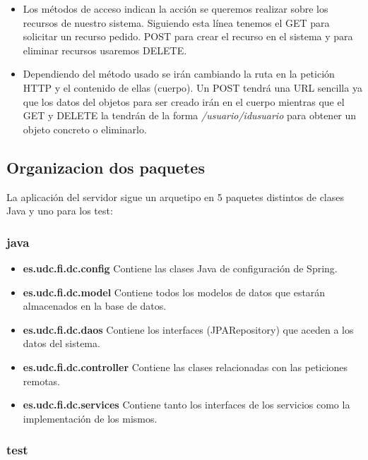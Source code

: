 \begin{itemize}
\item Los métodos de acceso indican la acción se queremos realizar sobre los recursos de nuestro sistema. Siguiendo esta línea tenemos el GET para solicitar un recurso pedido. POST para crear el recurso en el sistema y  para eliminar recursos usaremos DELETE. 



\item Dependiendo del método usado se irán cambiando la ruta en la petición HTTP y el contenido de ellas (cuerpo). Un POST tendrá una URL sencilla ya que los datos del objetos para ser creado irán en el cuerpo mientras que el GET y DELETE la tendrán de la forma \textit{ /usuario/{idusuario}} para obtener un objeto concreto o eliminarlo.





 


\end{itemize}

\subsection{Organizacion dos paquetes}
La aplicación del servidor sigue un arquetipo en 5 paquetes distintos de clases Java y uno para los test:
\subsubsection{java}
\begin{itemize}
\item\textbf{ es.udc.fi.dc.config} Contiene las clases Java de configuración de Spring.
\item \textbf{es.udc.fi.dc.model} Contiene todos los modelos de datos que estarán almacenados en la base de datos.
\item \textbf{es.udc.fi.dc.daos} Contiene los interfaces (JPARepository) que aceden a los datos del sistema.
\item \textbf{es.udc.fi.dc.controller} Contiene las clases relacionadas  con las peticiones remotas.
\item  \textbf{es.udc.fi.dc.services} Contiene tanto los interfaces de los servicios como la implementación de los mismos.


\end{itemize}
\subsubsection{test}

